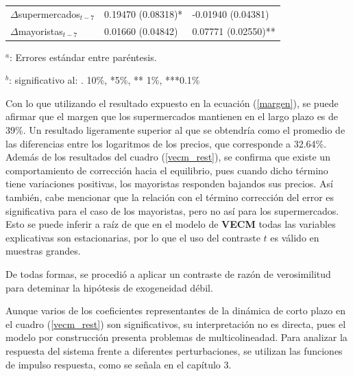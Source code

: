 \begin{table}[!htpb]
\begin{threeparttable}
\begin{tabular}{@{}lll@{}}
$\Delta$supermercados$_{t-7} $ & 0.19470 (0.08318)*    &  -0.01940 (0.04381)  \\     
$\Delta$mayoristas$_{t-7}    $ &  0.01660 (0.04842)  &  0.07771 (0.02550)**   \\   
\bottomrule
\end{tabular}
\begin{tablenotes}
\small 
\item $^{a}$: Errores estándar entre paréntesis. 
\item $^{b}$: significativo al: . 10\%, *5\%, ** 1\%, ***0.1\%
\end{tablenotes}
\end{threeparttable}
\end{table}

Con lo que utilizando el resultado expuesto en la ecuación (\ref{margen}), se puede afirmar que el margen que los supermercados mantienen en el largo plazo es de 39\%. Un resultado ligeramente superior al que se obtendría como el promedio de las diferencias entre los logaritmos de los precios, que corresponde a 32.64\%. Además de los resultados del cuadro (\ref{vecm_rest}), se confirma que existe un comportamiento de corrección hacia el equilibrio, pues cuando dicho término tiene variaciones positivas, los mayoristas responden bajandos sus precios. Así también, cabe mencionar que la relación con el término corrección del error es significativa para el caso de los mayoristas, pero no así para los supermercados. Esto se puede inferir a raíz de que en el modelo de \textbf{VECM} todas las variables explicativas son estacionarias, por lo que el uso del contraste $t$ es válido en muestras grandes. 

De todas formas, se procedió a aplicar un contraste de razón de verosimilitud para deteminar la hipótesis de exogeneidad débil. 



Aunque varios de los coeficientes representantes de la dinámica de corto plazo en el cuadro (\ref{vecm_rest}) son significativos, su interpretación no es directa, pues el modelo por construcción presenta problemas de multicolineadad. Para analizar la respuesta del sistema frente a diferentes perturbaciones, se utilizan las funciones de impulso respuesta, como se señala en el capítulo 3. 



